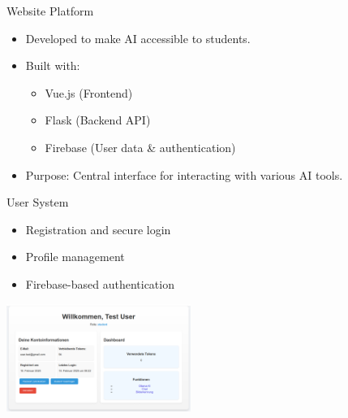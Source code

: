 \documentclass{beamer}
\begin{document}
\begin{frame}{Website Platform}
  \begin{itemize}
    \item Developed to make AI accessible to students.
    \item Built with:
    \begin{itemize}
      \item Vue.js (Frontend)
      \item Flask (Backend API)
      \item Firebase (User data \& authentication)
    \end{itemize}
    \item Purpose: Central interface for interacting with various AI tools.
  \end{itemize}
  \vspace{0.5cm}
  \centering
\end{frame}

\begin{frame}{User System}
  \begin{itemize}
    \item Registration and secure login
    \item Profile management
    \item Firebase-based authentication
  \end{itemize}
  \vspace{0.5cm}
  \centering
  \includegraphics[height=3.5cm]{Account-Managment.png} %
\end{frame}
\end{document}
